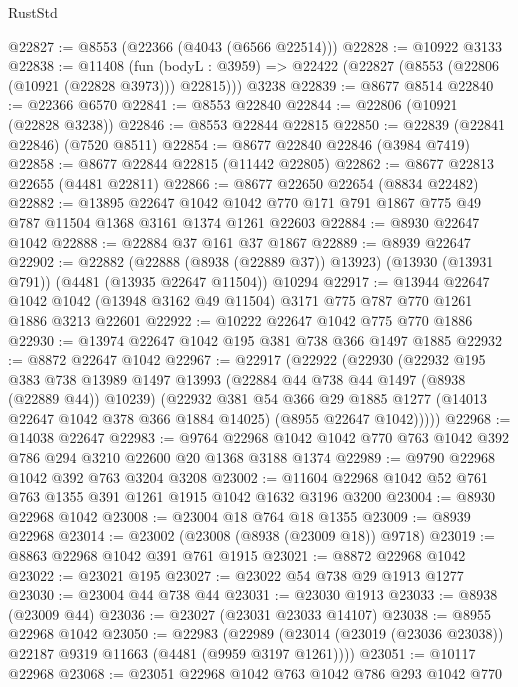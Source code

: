 \begin{lexlean}{RustStd}
\begin{coremodule}
@22827 := @8553 (@22366 (@4043 (@6566 @22514)))
@22828 := @10922 @3133
@22838 := @11408
    (fun (bodyL : @3959) => @22422 (@22827 (@8553 (@22806 (@10921 (@22828 @3973))) @22815)))
    @3238
@22839 := @8677 @8514
@22840 := @22366 @6570
@22841 := @8553 @22840
@22844 := @22806 (@10921 (@22828 @3238))
@22846 := @8553 @22844 @22815
@22850 := @22839 (@22841 @22846) (@7520 @8511)
@22854 := @8677 @22840 @22846 (@3984 @7419)
@22858 := @8677 @22844 @22815 (@11442 @22805)
@22862 := @8677 @22813 @22655 (@4481 @22811)
@22866 := @8677 @22650 @22654 (@8834 @22482)
@22882 := @13895
    @22647
    @1042
    @1042
    @770
    @171
    @791
    @1867
    @775
    @49
    @787
    @11504
    @1368
    @3161
    @1374
    @1261
    @22603
@22884 := @8930 @22647 @1042
@22888 := @22884 @37 @161 @37 @1867
@22889 := @8939 @22647
@22902 := @22882
    (@22888 (@8938 (@22889 @37)) @13923)
    (@13930 (@13931 @791))
    (@4481 (@13935 @22647 @11504))
    @10294
@22917 := @13944
    @22647
    @1042
    @1042
    (@13948 @3162 @49 @11504)
    @3171
    @775
    @787
    @770
    @1261
    @1886
    @3213
    @22601
@22922 := @10222 @22647 @1042 @775 @770 @1886
@22930 := @13974 @22647 @1042 @195 @381 @738 @366 @1497 @1885
@22932 := @8872 @22647 @1042
@22967 := @22917
    (@22922
      (@22930
        (@22932
          @195
          @383
          @738
          @13989
          @1497
          @13993
          (@22884 @44 @738 @44 @1497 (@8938 (@22889 @44)) @10239)
          (@22932
            @381
            @54
            @366
            @29
            @1885
            @1277
            (@14013 @22647 @1042 @378 @366 @1884 @14025)
            (@8955 @22647 @1042)))))
@22968 := @14038 @22647
@22983 := @9764 @22968 @1042 @1042 @770 @763 @1042 @392 @786 @294 @3210 @22600 @20 @1368 @3188 @1374
@22989 := @9790 @22968 @1042 @392 @763 @3204 @3208
@23002 := @11604 @22968 @1042 @52 @761 @763 @1355 @391 @1261 @1915 @1042 @1632 @3196 @3200
@23004 := @8930 @22968 @1042
@23008 := @23004 @18 @764 @18 @1355
@23009 := @8939 @22968
@23014 := @23002 (@23008 (@8938 (@23009 @18)) @9718)
@23019 := @8863 @22968 @1042 @391 @761 @1915
@23021 := @8872 @22968 @1042
@23022 := @23021 @195
@23027 := @23022 @54 @738 @29 @1913 @1277
@23030 := @23004 @44 @738 @44
@23031 := @23030 @1913
@23033 := @8938 (@23009 @44)
@23036 := @23027 (@23031 @23033 @14107)
@23038 := @8955 @22968 @1042
@23050 := @22983
    (@22989 (@23014 (@23019 (@23036 @23038)) @22187 @9319 @11663 (@4481 (@9959 @3197 @1261))))
@23051 := @10117 @22968
@23068 := @23051
    @22968
    @1042
    @763
    @1042
    @786
    @293
    @1042
    @770

\end{coremodule}
\end{lexlean}
